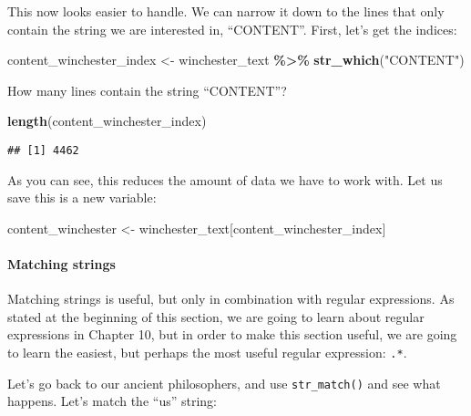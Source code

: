 \documentclass[
]{article}
\newenvironment{Shaded}{\begin{snugshade}}{\end{snugshade}}
\newcommand{\KeywordTok}[1]{\textcolor[rgb]{0.13,0.29,0.53}{\textbf{#1}}}
\newcommand{\NormalTok}[1]{#1}
\newcommand{\OperatorTok}[1]{\textcolor[rgb]{0.81,0.36,0.00}{\textbf{#1}}}
\newcommand{\StringTok}[1]{\textcolor[rgb]{0.31,0.60,0.02}{#1}}
\begin{document}
This now looks easier to handle. We can narrow it down to the lines that only contain the string
we are interested in, ``CONTENT''. First, let's get the indices:

\begin{Shaded}
\begin{Highlighting}[]
\NormalTok{content\_winchester\_index \textless{}{-}}\StringTok{ }\NormalTok{winchester\_text }\OperatorTok{\%\textgreater{}\%}
\StringTok{  }\KeywordTok{str\_which}\NormalTok{(}\StringTok{"CONTENT"}\NormalTok{)}
\end{Highlighting}
\end{Shaded}

How many lines contain the string ``CONTENT''?

\begin{Shaded}
\begin{Highlighting}[]
\KeywordTok{length}\NormalTok{(content\_winchester\_index)}
\end{Highlighting}
\end{Shaded}

\begin{verbatim}
## [1] 4462
\end{verbatim}

As you can see, this reduces the amount of data we have to work with. Let us save this is a new
variable:

\begin{Shaded}
\begin{Highlighting}[]
\NormalTok{content\_winchester \textless{}{-}}\StringTok{ }\NormalTok{winchester\_text[content\_winchester\_index]}
\end{Highlighting}
\end{Shaded}

\hypertarget{matching-strings}{%
\paragraph{Matching strings}\label{matching-strings}}

Matching strings is useful, but only in combination with regular expressions. As stated at the
beginning of this section, we are going to learn about regular expressions in Chapter 10, but in
order to make this section useful, we are going to learn the easiest, but perhaps the most useful
regular expression: \texttt{.*}.

Let's go back to our ancient philosophers, and use \texttt{str\_match()} and see what happens. Let's match
the ``us'' string:
\end{document}
